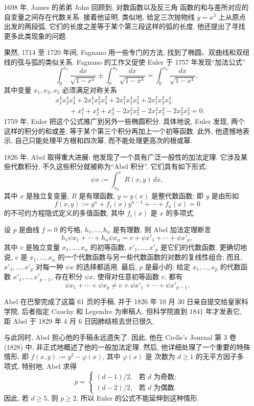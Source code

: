 1698 年, James 的弟弟 John 回顾到, 对数函数以及反三角
函数的和与差所对应的自变量之间存在代数关系. 接着他证明, 类似地, 给定三次抛物线 $y=x^3$ 上从原点出发的两段弧, 它们的长度之差等于某个第三段这样的弧的长度. 他还提出了寻找更多此类现象的问题.

果然, 1714 至 1720 年间, Fagnano 用一些专门的方法, 找到了椭圆、双曲线和双纽线的弦与弧的类似关系. Fagnano 的工作又促使 Euler 于 1757 年发现“加法公式”
\[
\int_0^{x_1}\frac{dx}{\sqrt{1-x^4}}\mathbin{\pm}\int_0^{x_2}\frac{dx}{\sqrt{1-x^4}}=\int_0^{x_3}\frac{dx}{\sqrt{1-x^4}},
\]
其中变量 $x_1,x_2,x_3$ 必须满足对称关系
\[
\begin{aligned}
&x_1^4x_2^4x_3^4+2x_1^4x_2^2x_3^2+2x_1^2x_2^4x_3^2+2x_1^2x_2^2x_3^4\\
&\qquad+x_1^4+x_2^4+x_3^4-2x_1^2x_2^2-2x_1^2x_3^2-2x_2^2x_3^2=0.
\end{aligned}
\]
1759 年, Euler 把这个公式推广到另外一些椭圆积分. 具体地说, Euler 发现, 两个这样的积分的和或差, 等于某个第三个积分再加上一个初等函数. 此外, 他遗憾地表示, 自己只能处理平方根和四次幂, 而不能处理更高次的根或幂.

1826 年, Abel 取得重大进展: 他发现了一个具有广泛一般性的加法定理. 它涉及某些代数积分, 不久这些积分就被称为“Abel 积分”. 它们具有如下形式:
\[
\psi x:=\int_{x_0}^xR(x,y)\,dx,
\]
其中 $x$ 是独立复变量, $R$ 是有理函数, $y=y(x)$ 是整代数函数; 即 $y$ 是由形如
\[
f(x,y):=y^n+f_1(x)y^{n-1}+\cdots+f_n(x)=0
\]
的不可约方程隐式定义的多值函数, 其中 $f_i(x)$ 是 $x$ 的多项式.

设 $p$ 是曲线 $f=0$ 的亏格, $h_1,\ldots,h_\alpha$ 是有理数. 则 Abel 加法定理断言
\[
h_1\psi x_1+\cdots+h_\alpha\psi x_\alpha=v+\psi x'_1+\cdots+\psi x'_p,
\]
其中 $v$ 是独立变量 $x_1,\ldots,x_\alpha$ 的初等函数, $x'_1,\ldots,x'_p$ 是它们的代数函数. 更确切地说, $v$ 是 $x_1,\ldots,x_\alpha$ 的一个代数函数与另一些代数函数的对数的复线性组合; 而且, $x'_1,\ldots,x'_p$ 对每一种 $\psi x$ 的选择都适用. 最后, $p$ 是最小的: 给定 $x_1,\ldots,x_p$ 的代数函数 $x'_1,\ldots,x'_{p-1}$, 存在积分 $\psi x$, 使得对任意初等函数 $v$, 都有
\[
\psi x_1+\cdots+\psi x_p\ne v+\psi x'_1+\cdots+\psi x'_{p-1}.
\]

Abel 在巴黎完成了这篇 61 页的手稿, 并于 1826 年 10 月 30 日亲自提交给皇家科学院, 后者指定 Cauchy 和 Legendre 为审稿人. 但科学院直到 1841 年才发表它, 距 Abel 于 1829 年 4 月 6 日因肺结核去世已很久.

与此同时, Abel 担心他的手稿永远遗失了. 因此, 他在 Crelle's Journal 第 3 卷 (1828) 中, 非正式地概述了他的一般加法定理. 然后, 他详细处理了一个重要的特殊情形, 即 $f(x,y):=y^2-\varphi(x)$, 其中 $\varphi(x)$ 是
次数为 $d\geq1$ 的无平方因子多项式. 特别地, Abel 求得
\[
p=\begin{cases}(d-1)/2,&\text{若 }d\text{ 为奇数};\\(d-2)/2,&\text{若 }d\text{ 为偶数}.\end{cases}
\]
因此, 若 $d\geq5$, 则 $p\geq2$, 所以 Euler 的公式不能延伸到这种情形.

